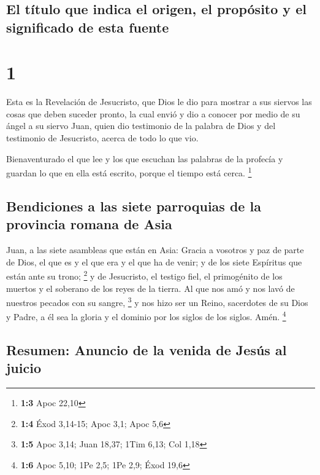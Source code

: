 \hypertarget{el-tuxedtulo-que-indica-el-origen-el-propuxf3sito-y-el-significado-de-esta-fuente}{%
\subsection{El título que indica el origen, el propósito y el
significado de esta
fuente}\label{el-tuxedtulo-que-indica-el-origen-el-propuxf3sito-y-el-significado-de-esta-fuente}}

\hypertarget{section}{%
\section{1}\label{section}}

 Esta es la Revelación de Jesucristo, que Dios le dio para
mostrar a sus siervos las cosas que deben suceder pronto, la cual envió
y dio a conocer por medio de su ángel a su siervo Juan, 
quien dio testimonio de la palabra de Dios y del testimonio de
Jesucristo, acerca de todo lo que vio.

 Bienaventurado el que lee y los que escuchan las palabras
de la profecía y guardan lo que en ella está escrito, porque el tiempo
está cerca. \footnote{\textbf{1:3} Apoc 22,10}

\hypertarget{bendiciones-a-las-siete-parroquias-de-la-provincia-romana-de-asia}{%
\subsection{Bendiciones a las siete parroquias de la provincia romana de
Asia}\label{bendiciones-a-las-siete-parroquias-de-la-provincia-romana-de-asia}}

 Juan, a las siete asambleas que están en Asia: Gracia a
vosotros y paz de parte de Dios, el que es y el que era y el que ha de
venir; y de los siete Espíritus que están ante su trono; \footnote{\textbf{1:4}
  Éxod 3,14-15; Apoc 3,1; Apoc 5,6}  y de Jesucristo, el
testigo fiel, el primogénito de los muertos y el soberano de los reyes
de la tierra. Al que nos amó y nos lavó de nuestros pecados con su
sangre, \footnote{\textbf{1:5} Apoc 3,14; Juan 18,37; 1Tim 6,13; Col
  1,18}  y nos hizo ser un Reino, sacerdotes de su Dios y
Padre, a él sea la gloria y el dominio por los siglos de los siglos.
Amén. \footnote{\textbf{1:6} Apoc 5,10; 1Pe 2,5; 1Pe 2,9; Éxod 19,6}

\hypertarget{resumen-anuncio-de-la-venida-de-jesuxfas-al-juicio}{%
\subsection{Resumen: Anuncio de la venida de Jesús al
juicio}\label{resumen-anuncio-de-la-venida-de-jesuxfas-al-juicio}}

